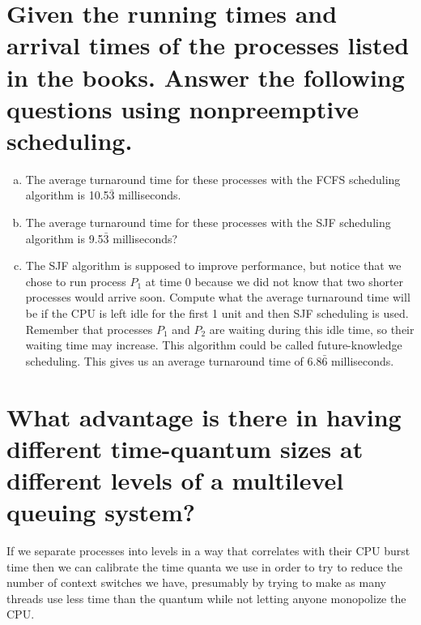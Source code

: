 \documentclass{book}%
\begin{document}
\section{Given the running times and arrival times of the processes listed in the books. Answer the following questions using nonpreemptive scheduling.}
\begin{enumerate}[(a)]
\item The average turnaround time for these processes with the FCFS scheduling algorithm is 10.5$\bar{3}$ milliseconds.
\item The average turnaround time for these processes with the SJF scheduling algorithm is 9.5$\bar{3}$ milliseconds?
\item The SJF algorithm is supposed to improve performance, but notice that we chose to run process $P_1$ at time 0 because we did not know that two shorter processes would arrive soon. Compute what the average turnaround time will be if the CPU is left idle for the first 1 unit and then SJF scheduling is used. Remember that processes $P_1$ and $P_2$ are waiting during this idle time, so their waiting time may increase. This algorithm could be called future-knowledge scheduling. This gives us an average turnaround time of 6.8$\bar{6}$ milliseconds.
\end{enumerate}
\section{What advantage is there in having different time-quantum sizes at different levels of a multilevel queuing system?}
If we separate processes into levels in a way that correlates with their CPU burst time then we can calibrate the time quanta we use in order to try to reduce the number of context switches we have, presumably by trying to make as many threads use less time than the quantum while not letting anyone monopolize the CPU.
\end{document}
